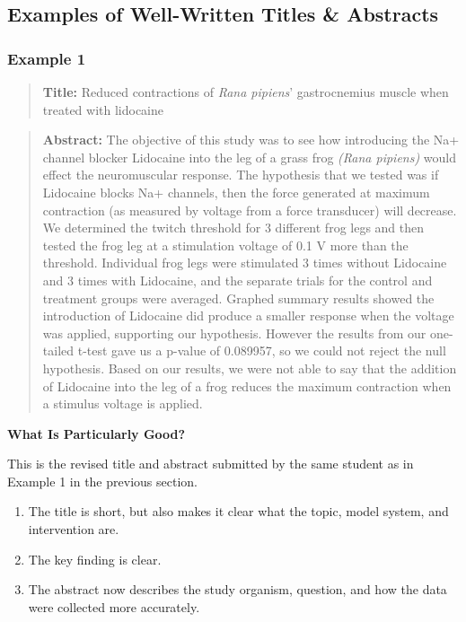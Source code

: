 \documentclass[
]{book}
\providecommand{\tightlist}{%
  \setlength{\itemsep}{0pt}\setlength{\parskip}{0pt}}
\begin{document}
\hypertarget{examples-of-well-written-titles-abstracts}{%
\subsection{Examples of Well-Written Titles \& Abstracts}\label{examples-of-well-written-titles-abstracts}}

\hypertarget{example-1-1}{%
\subsubsection{Example 1}\label{example-1-1}}

\begin{quote}
\textbf{Title:} Reduced contractions of \emph{Rana pipiens}' gastrocnemius muscle when treated with lidocaine
\end{quote}

\begin{quote}
\textbf{Abstract:} The objective of this study was to see how introducing the Na+ channel blocker Lidocaine into the leg of a grass frog \emph{(Rana pipiens)} would effect the neuromuscular response. The hypothesis that we tested was if Lidocaine blocks Na+ channels, then the force generated at maximum contraction (as measured by voltage from a force transducer) will decrease. We determined the twitch threshold for 3 different frog legs and then tested the frog leg at a stimulation voltage of 0.1 V more than the threshold. Individual frog legs were stimulated 3 times without Lidocaine and 3 times with Lidocaine, and the separate trials for the control and treatment groups were averaged. Graphed summary results showed the introduction of Lidocaine did produce a smaller response when the voltage was applied, supporting our hypothesis. However the results from our one-tailed t-test gave us a p-value of 0.089957, so we could not reject the null hypothesis. Based on our results, we were not able to say that the addition of Lidocaine into the leg of a frog reduces the maximum contraction when a stimulus voltage is applied.
\end{quote}

\textbf{What Is Particularly Good?}

This is the revised title and abstract submitted by the same student as in Example 1 in the previous section.

\begin{enumerate}
\def\labelenumi{\arabic{enumi}.}
\tightlist
\item
  The title is short, but also makes it clear what the topic, model system, and intervention are.
\item
  The key finding is clear.
\item
  The abstract now describes the study organism, question, and how the data were collected more accurately.
\end{enumerate}
\end{document}
